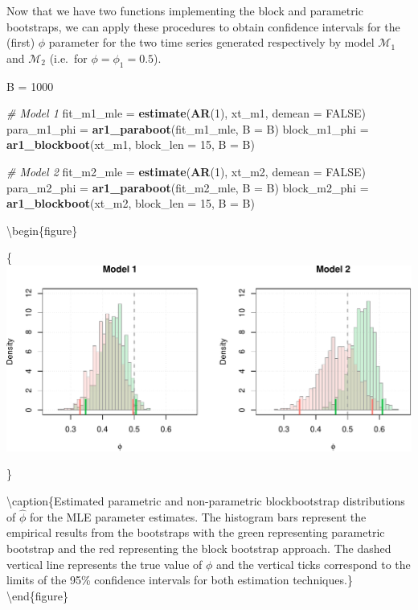 \documentclass[]{book}
\newenvironment{Shaded}{\begin{snugshade}}{\end{snugshade}}
\newcommand{\KeywordTok}[1]{\textcolor[rgb]{0.13,0.29,0.53}{\textbf{#1}}}
\newcommand{\DataTypeTok}[1]{\textcolor[rgb]{0.13,0.29,0.53}{#1}}
\newcommand{\DecValTok}[1]{\textcolor[rgb]{0.00,0.00,0.81}{#1}}
\newcommand{\StringTok}[1]{\textcolor[rgb]{0.31,0.60,0.02}{#1}}
\newcommand{\CommentTok}[1]{\textcolor[rgb]{0.56,0.35,0.01}{\textit{#1}}}
\newcommand{\OtherTok}[1]{\textcolor[rgb]{0.56,0.35,0.01}{#1}}
\newcommand{\NormalTok}[1]{#1}
\theoremstyle{definition}
\theoremstyle{definition}
\theoremstyle{definition}
\theoremstyle{remark}
\begin{document}
Now that we have two functions implementing the block and parametric
bootstraps, we can apply these procedures to obtain confidence intervals
for the (first) \(\phi\) parameter for the two time series generated
respectively by model \(\mathcal{M}_1\) and \(\mathcal{M}_2\) (i.e.~for
\(\phi = \phi_1 = 0.5\)).

\begin{Shaded}
\begin{Highlighting}[]
\NormalTok{B =}\StringTok{ }\DecValTok{1000}

\CommentTok{# Model 1 }
\NormalTok{fit_m1_mle =}\StringTok{ }\KeywordTok{estimate}\NormalTok{(}\KeywordTok{AR}\NormalTok{(}\DecValTok{1}\NormalTok{), xt_m1, }\DataTypeTok{demean =} \OtherTok{FALSE}\NormalTok{)}
\NormalTok{para_m1_phi  =}\StringTok{ }\KeywordTok{ar1_paraboot}\NormalTok{(fit_m1_mle, }\DataTypeTok{B =}\NormalTok{ B)}
\NormalTok{block_m1_phi =}\StringTok{ }\KeywordTok{ar1_blockboot}\NormalTok{(xt_m1, }\DataTypeTok{block_len =} \DecValTok{15}\NormalTok{, }\DataTypeTok{B =}\NormalTok{ B)}

\CommentTok{# Model 2 }
\NormalTok{fit_m2_mle =}\StringTok{ }\KeywordTok{estimate}\NormalTok{(}\KeywordTok{AR}\NormalTok{(}\DecValTok{1}\NormalTok{), xt_m2, }\DataTypeTok{demean =} \OtherTok{FALSE}\NormalTok{)}
\NormalTok{para_m2_phi  =}\StringTok{ }\KeywordTok{ar1_paraboot}\NormalTok{(fit_m2_mle, }\DataTypeTok{B =}\NormalTok{ B)}
\NormalTok{block_m2_phi =}\StringTok{ }\KeywordTok{ar1_blockboot}\NormalTok{(xt_m2, }\DataTypeTok{block_len =} \DecValTok{15}\NormalTok{, }\DataTypeTok{B =}\NormalTok{ B)}
\end{Highlighting}
\end{Shaded}

\textbackslash{}begin\{figure\}

\{\centering \includegraphics{ts_files/figure-latex/blockbootmodels-1}

\}

\textbackslash{}caption\{Estimated parametric and non-parametric
blockbootstrap distributions of \(\hat{\phi}\) for the MLE parameter
estimates. The histogram bars represent the empirical results from the
bootstraps with the green representing parametric bootstrap and the red
representing the block bootstrap approach. The dashed vertical line
represents the true value of \(\phi\) and the vertical ticks correspond
to the limits of the 95\% confidence intervals for both estimation
techniques.\}\label{fig:blockbootmodels} \textbackslash{}end\{figure\}
\end{document}
